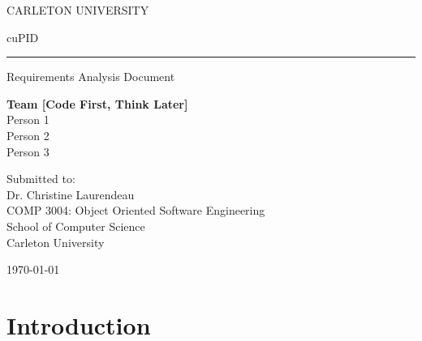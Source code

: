 \documentclass[12pt,letterpaper]{article}
\begin{document}
\renewcommand\headrule{}

\pagestyle{fancy}
\fancyhf{}
\rfoot{\thepage/\pageref{LastPage}}

\newcommand{\personone}{Person 1}
\newcommand{\persontwo}{Person 2}
\newcommand{\personthree}{Person 3}
\thispagestyle{empty}

\begin{center}
CARLETON UNIVERSITY
\end{center}

\vfill

\begin{center}
{\Huge cuPID}
\vspace{0.5em}\rule{\textwidth}{0.5pt}
Requirements Analysis Document
\end{center}

\vspace{1em}

\begin{center}
\textbf{Team [Code First, Think Later]}\\
\personone{}\\
\persontwo{}\\
\personthree{}
\end{center}

\vfill

\begin{center}
Submitted to:\\
Dr. Christine Laurendeau\\
COMP 3004: Object Oriented Software Engineering\\
School of Computer Science\\
Carleton University
\end{center}

\vspace{1em}

\begin{center}
\today
\end{center}

\newpage{}

\tableofcontents{}

\renewcommand{\listfigurename}{Figures}
\listoffigures

\renewcommand{\listtablename}{Tables}
\listoftables

\newpage{}

\section{Introduction}
\end{document}
